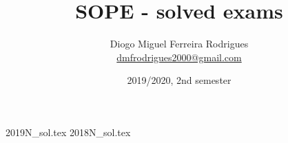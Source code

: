 \documentclass[a4paper]{book}
\title{SOPE - solved exams}
\author{Diogo Miguel Ferreira Rodrigues \\ \href{mailto:dmfrodrigues2000@gmail.com}{dmfrodrigues2000@gmail.com}}
\date{2019/2020, 2nd semester}
\begin{document}
\begingroup
	\maketitle
	\let\clearpage\relax
	\setcounter{tocdepth}{1}
	\tableofcontents
\endgroup
{2019N_sol.tex}
{2018N_sol.tex}
\end{document}
